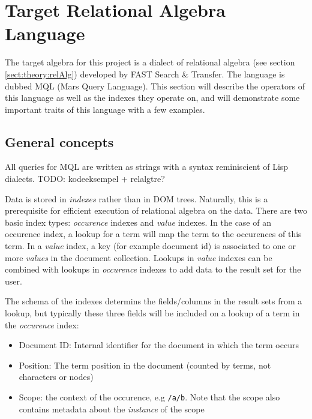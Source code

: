 \section{Target Relational Algebra Language}
The target algebra for this project is a dialect of relational algebra (see
section \ref{sect:theory:relAlg}) developed by FAST Search \& Transfer. The
language is dubbed MQL (Mars Query Language). This section will describe the
operators of this language as well as the indexes they operate on, and will
demonstrate some important traits of this language with a few examples. 

\subsection{General concepts}
All queries for MQL are written as strings with a syntax reminiscient of Lisp
dialects. TODO: kodeeksempel + relalgtre?

 Data is stored in \textit{indexes}
rather than in DOM trees. Naturally, this is a prerequisite for efficient execution of relational algebra on the data. There are two basic index types: \textit{occurence} indexes and \textit{value}
indexes. In the case of an occurence index, a lookup for a term will map the
term to the occurences of this term. In a \textit{value} index, a key (for
example document id) is associated to one or more \textit{values} in the
document collection. Lookups in \textit{value} indexes can be combined with
lookups in \textit{occurence} indexes to add data to the result set for the
user.

The schema of the indexes determins the fields/columns in the result sets from
a lookup, but typically these three fields will be included on a lookup of a
term in the \textit{occurence} index:
\begin{itemize}
  \item Document ID: Internal identifier for the document in which the term
  occurs
  \item Position: The term position in the document (counted by terms, not
  characters or nodes)
  \item Scope: the context of the occurence, e.g \texttt{/a/b}. Note that the
  scope also contains metadata about the \textit{instance} of the scope
\end{itemize}


